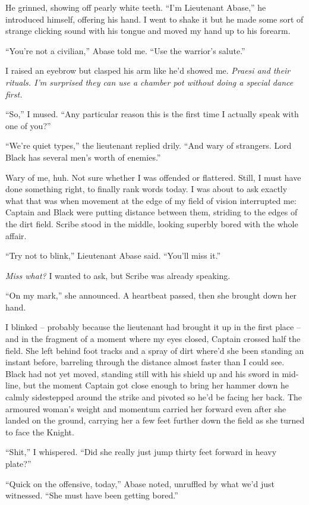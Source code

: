 \documentclass[12pt, openany]{book}
\begin{document}
He grinned, showing off pearly white teeth. “I’m Lieutenant Abase,” he introduced himself, offering his hand. I went to shake it but he made some sort of strange clicking sound with his tongue and moved my hand up to his forearm.

“You’re not a civilian,” Abase told me. “Use the warrior’s salute.”

I raised an eyebrow but clasped his arm like he’d showed me. \textit{Praesi and their rituals. I’m surprised they can use a chamber pot without doing a special dance first.}

“So,” I mused. “Any particular reason this is the first time I actually speak with one of you?”

“We’re quiet types,” the lieutenant replied drily. “And wary of strangers. Lord Black has several men’s worth of enemies.”

Wary of me, huh. Not sure whether I was offended or flattered. Still, I must have done something right, to finally rank words today. I was about to ask exactly what that was when movement at the edge of my field of vision interrupted me: Captain and Black were putting distance between them, striding to the edges of the dirt field. Scribe stood in the middle, looking superbly bored with the whole affair.

“Try not to blink,” Lieutenant Abase said. “You’ll miss it.”

\textit{Miss what?} I wanted to ask, but Scribe was already speaking.

“On my mark,” she announced. A heartbeat passed, then she brought down her hand.

I blinked – probably because the lieutenant had brought it up in the first place – and in the fragment of a moment where my eyes closed, Captain crossed half the field. She left behind foot tracks and a spray of dirt where’d she been standing an instant before, barreling through the distance almost faster than I could see. Black had not yet moved, standing still with his shield up and his sword in mid-line, but the moment Captain got close enough to bring her hammer down he calmly sidestepped around the strike and pivoted so he’d be facing her back. The armoured woman’s weight and momentum carried her forward even after she landed on the ground, carrying her a few feet further down the field as she turned to face the Knight.

“Shit,” I whispered. “Did she really just jump thirty feet forward in heavy plate?”

“Quick on the offensive, today,” Abase noted, unruffled by what we’d just witnessed. “She must have been getting bored.”
\end{document}

